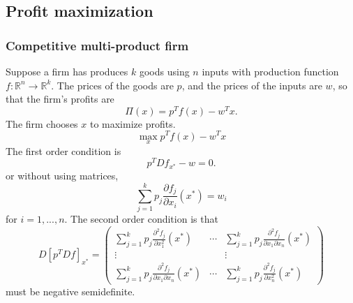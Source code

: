 \documentclass[12pt,reqno]{amsart}
\theoremstyle{definition}
\def\R{\mathbb{R}}
\renewcommand{\to}{{\rightarrow}}
\begin{document}
\subsection{Profit maximization}

\subsubsection{Competitive multi-product firm}
Suppose a firm has produces $k$ goods using $n$ inputs with production
function $f: \R^n \to \R^k$. The prices of the goods are $p$, and the
prices of the inputs are $w$, so that the firm's profits are 
\[ \Pi(x) =  p^T f(x) -  w^Tx. \]
The firm chooses $x$ to maximize profits.
\[ \max_x p^T f(x) - w^T x \]
The first order condition is
\[ p^T Df_{x^*} - w = 0. \]
or without using matrices,
\[ \sum_{j=1}^k p_j \frac{\partial f_j}{\partial x_i}(x^*) = w_i \]
for $i=1,..., n$. The second order condition is that 
\[ D[p^T Df]_{x^*} = \begin{pmatrix} \sum_{j=1}^k p_j \frac{\partial^2
    f_j}{\partial x_1^2}(x^*) & \cdots & \sum_{j=1}^k p_j \frac{\partial^2
    f_j}{\partial x_1\partial x_n}(x^*)  \\ \vdots & & \vdots \\
  \sum_{j=1}^k p_j \frac{\partial^2
    f_j}{\partial x_1\partial x_n}(x^*) & \cdots & \sum_{j=1}^k p_j
  \frac{\partial^2 f_j}{\partial x_n^2}(x^*) \end{pmatrix} 
\]
must be negative semidefinite. 
\end{document}
